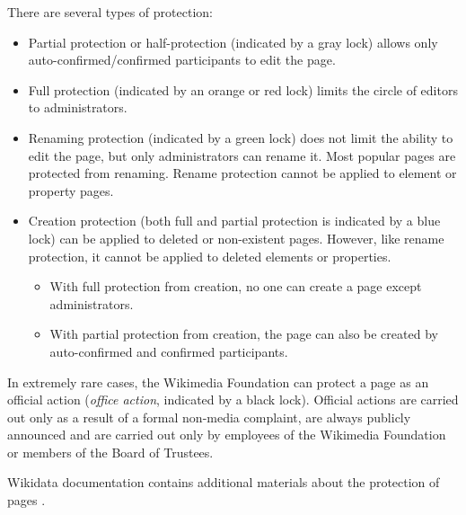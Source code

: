 There are several types of protection:
\begin{itemize}
\item Partial protection or half-protection (indicated by a gray lock) allows only auto-confirmed/confirmed participants to edit the page.
  \item Full protection (indicated by an orange or red lock) limits the circle of editors to administrators.
  \item Renaming protection (indicated by a green lock) does not limit the ability to edit the page, but only administrators can rename it. Most popular pages are protected from renaming. Rename protection cannot be applied to element or property pages.
  \item Creation protection (both full and partial protection is indicated by a blue lock) can be applied to deleted or non-existent pages. However, like rename protection, it cannot be applied to deleted elements or properties.
  \begin{itemize}
	\item With full protection from creation, no one can create a page except administrators.
	\item With partial protection from creation, the page can also be created by auto-confirmed and confirmed participants.
  \end{itemize}
\end{itemize}

In extremely rare cases, the Wikimedia Foundation can protect a page as an official action (\textit{office action}, indicated by a black lock). Official actions are carried out only as a result of a formal non-media complaint, are always publicly announced and are carried out only by employees of the Wikimedia Foundation or members of the Board of Trustees.

Wikidata documentation contains additional materials about the protection of pages\protect\footnotemark
{}.
